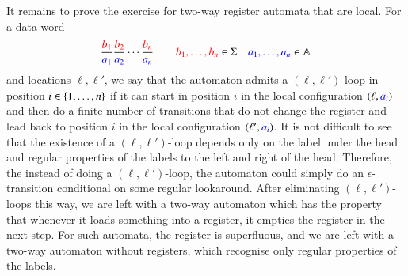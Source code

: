 {It remains to prove the exercise for two-way register automata that are local. For a data word
\begin{align*}
 \frac {\color {red} b_1}{ \color{blue}a_1} \frac {\color {red} b_2}{ \color{blue}a_2} \cdots \frac {\color {red} b_n}{ \color{blue}a_n} \qquad {\color{red} b_1,\ldots,b_n} \in \Sigma \quad {\color{blue} a_1,\ldots,a_n} \in \mathbb A 
\end{align*}
and locations $\ell,\ell'$, we say that the automaton admits a $(\ell,\ell')$-loop in position $i \in \{1,\ldots,n\}$ if it can start in position $i$ in the local configuration $(\ell,{\color {blue} a_i})$ and then do a finite number of transitions that do not change the register and lead back to position $i$ in the local configuration $(\ell',{\color {blue} a_i})$. It is not difficult to see that the existence of a $(\ell,\ell')$-loop depends only on the label under the head and regular properties of the labels to the left and right of the head. Therefore, the instead of doing a $(\ell,\ell')$-loop, the automaton could simply do an $\epsilon$-transition conditional on some regular lookaround. After eliminating $(\ell,\ell')$-loops this way, we are left with a two-way automaton which has the property that whenever it loads something into a register, it empties the register in the next step. For such automata, the register is superfluous, and we are left with a two-way automaton without registers, which recognise only regular properties of the labels.
}




